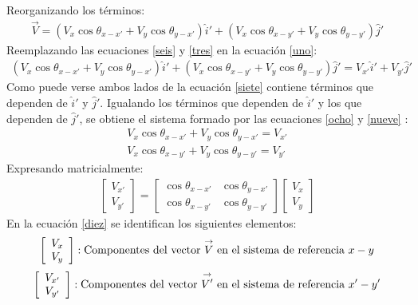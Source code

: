 \documentclass[12pt,letterpaper, twoside, openany]{article}
\begin{document}
Reorganizando los términos:
%
\begin{align}
	\overset{\rightarrow}{V} = \left( V_x \cos \theta_{x-x'} + V_y \cos \theta_{y-x'} \right) \hat{i}'+ \left( V_x \cos \theta_{x-y'} + V_y \cos \theta_{y-y'} \right) \hat{j}' \label{seis}
\end{align}
%
Reemplazando las ecuaciones \ref{seis} y \ref{tres} en la ecuación \ref{uno}:
%
\begin{align}
	\left( V_x \cos \theta_{x-x'} + V_y \cos \theta_{y-x'} \right) \hat{i}'+ \left( V_x \cos \theta_{x-y'} + V_y \cos \theta_{y-y'} \right) \hat{j}' = V_{x'} \hat{i}' + V_{y'} \hat{j}' \label{siete}
\end{align}
%
Como puede verse ambos lados de la ecuación \ref{siete} contiene términos que dependen de $\hat{i}'$
y $\hat{j}'$. Igualando los términos que dependen de $\hat{i}'$ y los que dependen de $\hat{j}'$, se obtiene el sistema formado por las ecuaciones \ref{ocho} y \ref{nueve} :
%
\begin{align}
	V_x \cos \theta_{x-x'} + V_y \cos \theta_{y-x'} = V_{x'} \label{ocho}\\
	V_x \cos \theta_{x-y'} + V_y \cos \theta_{y-y'} = V_{y'} \label{nueve}
\end{align}
%
Expresando matricialmente: 
%
\begin{eqnarray}
		\left[ \begin{array}{c} V_{x'} \\
		V_{y'} \end{array} \right] = 
		\left[ \begin{array}{cc}
		\cos \theta_{x-x'} & \cos \theta_{y-x'} \\  
		\cos \theta_{x-y'} & \cos \theta_{y-y'}
		\end{array}  \right] 
		\left[ \begin{array}{c} V_{x} \\
		V_{y} \end{array} \right]
		\label{diez}
\end{eqnarray}
%
En la ecuación \ref{diez} se identifican los siguientes elementos:
%
\begin{align*}
	\left[ \begin{array}{c}
		V_x \\
		V_y	
	\end{array} \right]: \textup{Componentes del vector $\overset{\rightarrow}{V}$ en el sistema de referencia $x-y$} 
\end{align*}
%
\begin{align*}
	\left[ \begin{array}{c}
		V_{x'} \\
		V_{y'}	
	\end{array} \right]: \textup{Componentes del vector $\overset{\rightarrow}{V'}$ en el sistema de referencia $x'-y'$} 
\end{align*}
\end{document}

